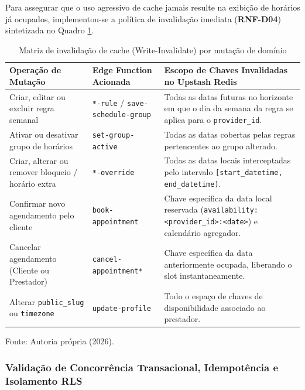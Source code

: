 \documentclass[12pt,a4paper]{article}
\begin{document}
Para assegurar que o uso agressivo de cache jamais resulte na exibição de horários já ocupados, implementou-se a política de invalidação imediata (\textbf{RNF-D04}) sintetizada no Quadro \ref{quadro:invalidacao_cache}.

\begin{table}[hbt]
\centering
\caption{Matriz de invalidação de cache (Write-Invalidate) por mutação de domínio}
\label{quadro:invalidacao_cache}
\footnotesize
\renewcommand{\arraystretch}{1.2}
\begin{tabularx}{\textwidth}{|p{4.6cm}|p{3.6cm}|X|}
\hline
\textbf{Operação de Mutação} & \textbf{Edge Function Acionada} & \textbf{Escopo de Chaves Invalidadas no Upstash Redis} \\ \hline
Criar, editar ou excluir regra semanal & \texttt{*-rule} / \texttt{save-schedule-group} & Todas as datas futuras no horizonte em que o dia da semana da regra se aplica para o \texttt{provider\_id}. \\ \hline
Ativar ou desativar grupo de horários & \texttt{set-group-active} & Todas as datas cobertas pelas regras pertencentes ao grupo alterado. \\ \hline
Criar, alterar ou remover bloqueio / horário extra & \texttt{*-override} & Todas as datas locais interceptadas pelo intervalo \texttt{[start\_datetime, end\_datetime)}. \\ \hline
Confirmar novo agendamento pelo cliente & \texttt{book-appointment} & Chave específica da data local reservada (\texttt{availability:<provider\_id>:<date>}) e calendário agregador. \\ \hline
Cancelar agendamento (Cliente ou Prestador) & \texttt{cancel-appointment*} & Chave específica da data anteriormente ocupada, liberando o slot instantaneamente. \\ \hline
Alterar \texttt{public\_slug} ou \texttt{timezone} & \texttt{update-profile} & Todo o espaço de chaves de disponibilidade associado ao prestador. \\ \hline
\end{tabularx}
\vspace{0.1cm}
{\footnotesize Fonte: Autoria própria (2026).}
\end{table}

\subsubsection{Validação de Concorrência Transacional, Idempotência e Isolamento RLS}
\label{subsubsec:avaliacao_concorrencia}
\end{document}
